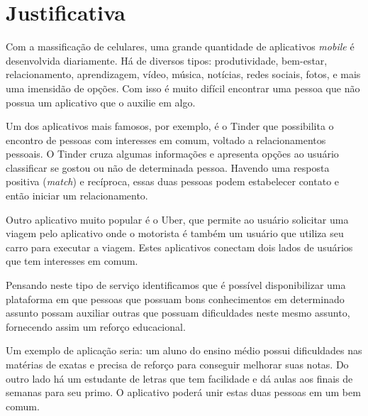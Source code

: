 \chapter[Justificativa]{Justificativa}

Com a massificação de celulares, uma grande quantidade de aplicativos \emph{mobile} é desenvolvida diariamente. Há de diversos tipos: produtividade, bem-estar, relacionamento, aprendizagem, vídeo, música, notícias, redes sociais, fotos, e mais uma imensidão de opções. 
Com isso é muito difícil encontrar uma pessoa que não possua um aplicativo que o auxilie em algo. 

Um dos aplicativos mais famosos, por exemplo, é o Tinder que possibilita o encontro de pessoas com interesses em comum, voltado a relacionamentos pessoais. O Tinder cruza algumas informações e apresenta opções ao usuário classificar se gostou ou não de determinada pessoa. Havendo uma resposta positiva (\emph{match}) e recíproca, essas duas pessoas podem estabelecer contato e então iniciar um relacionamento.

Outro aplicativo muito popular é o Uber, que permite ao usuário solicitar uma viagem pelo aplicativo onde o motorista é também um usuário que utiliza seu carro para executar a viagem. Estes aplicativos conectam dois lados de usuários que tem interesses em comum.

Pensando neste tipo de serviço identificamos que é possível disponibilizar uma plataforma em que pessoas que possuam bons conhecimentos em determinado assunto possam auxiliar outras que possuam dificuldades neste mesmo assunto, fornecendo assim um reforço educacional. 

Um exemplo de aplicação seria: um aluno do ensino médio possui dificuldades nas matérias de exatas e precisa de reforço para conseguir melhorar suas notas. Do outro lado há um estudante de letras que tem facilidade e dá aulas aos finais de semanas para seu primo. O aplicativo poderá unir estas duas pessoas em um bem comum.

